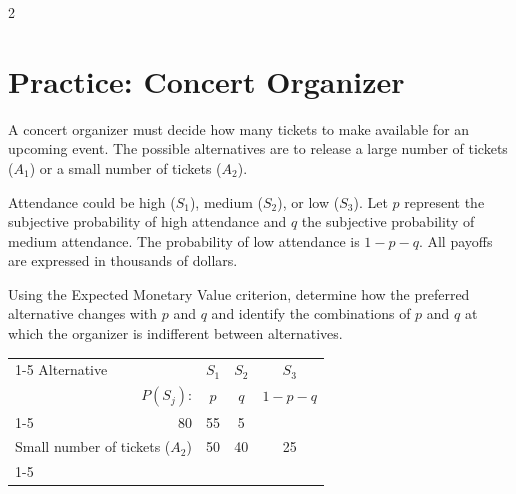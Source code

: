 \begin{multicols}{2}
	\section{Practice: Concert Organizer}
	
	A concert organizer must decide how many tickets to make available
	for an upcoming event. The possible alternatives are to release a
	large number of tickets ($A_1$) or a small number of tickets ($A_2$).
	
	Attendance could be high ($S_1$), medium ($S_2$), or low ($S_3$). Let $p$
	represent the subjective probability of high attendance and $q$ the
	subjective probability of medium attendance. The probability of low
	attendance is $1-p-q$. All payoffs are expressed in thousands of dollars.
	
	Using the Expected Monetary Value criterion, determine how the preferred
	alternative changes with $p$ and $q$ and identify the combinations of
	$p$ and $q$ at which the organizer is indifferent between alternatives.
	
	\vspace{-3mm}
	
	\begin{center}
		\renewcommand{\arraystretch}{1.3}
		\small
		\begin{tabular}{lr@{\qquad}ccc}
			\cmidrule{1-5}
			Alternative & & $S_1$ & $S_2$ & $S_3$ \\
			& $P(S_j)$: & $p$ & $q$ & $1-p-q$ \\
			\cmidrule{1-5}
			\multicolumn{2}{l}{Large number of tickets ($A_1$)} & 80 & 55 & 5 \\
			\multicolumn{2}{l}{Small number of tickets ($A_2$)} & 50 & 40 & 25 \\
			\cmidrule{1-5}
		\end{tabular}
	\end{center}
	
	\end{multicols}
	
